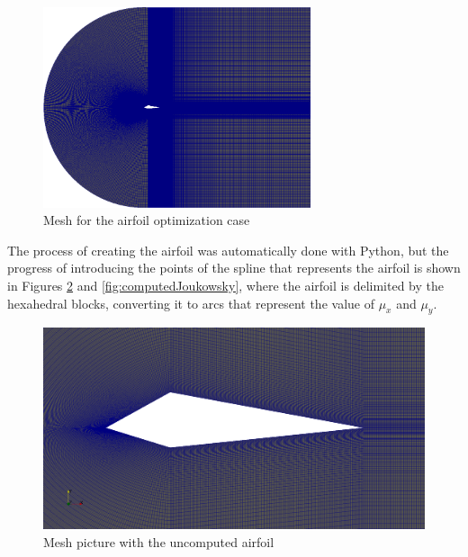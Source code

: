     
    
     \begin{figure}[h!]
        \centering
        \includegraphics[width=0.7\textwidth]{Figures/3/joukOverview.png}
        \caption{Mesh for the airfoil optimization case}
        \label{fig:airofilMeshPF}
    \end{figure}

The process of creating the airfoil was automatically done with Python, but the progress of introducing the points of the spline that represents the airfoil is shown in Figures \ref{fig:uncomputedJoukowsky} and \ref{fig:computedJoukowsky}, where the airfoil is delimited by the hexahedral blocks, converting it to arcs that represent the value of $\mu_x$ and $\mu_y$.

     \begin{figure}[h!]
        \centering
        \includegraphics[width=\textwidth]{Figures/3/joukRombo.png}
        \caption{Mesh picture with the uncomputed airfoil}
        \label{fig:uncomputedJoukowsky}
    \end{figure}

    \newpage
    

